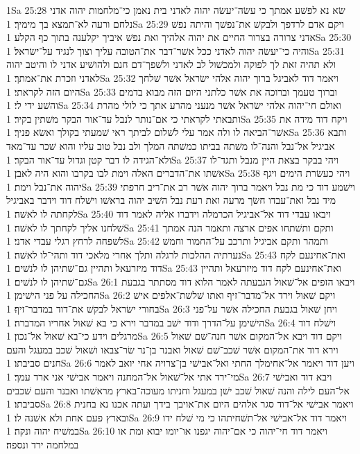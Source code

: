 1Sa 25:28  שׂא נא לפשׁע אמתך כי עשׂה־יעשׂה יהוה לאדני בית נאמן כי־מלחמות יהוה אדני נלחם ורעה לא־תמצא בך מימיך׃
1Sa 25:29  ויקם אדם לרדפך ולבקשׁ את־נפשׁך והיתה נפשׁ אדני צרורה בצרור החיים את יהוה אלהיך ואת נפשׁ איביך יקלענה בתוך כף הקלע׃
1Sa 25:30  והיה כי־יעשׂה יהוה לאדני ככל אשׁר־דבר את־הטובה עליך וצוך לנגיד על־ישׂראל׃
1Sa 25:31  ולא תהיה זאת לך לפוקה ולמכשׁול לב לאדני ולשׁפך־דם חנם ולהושׁיע אדני לו והיטב יהוה לאדני וזכרת את־אמתך׃
1Sa 25:32  ויאמר דוד לאביגל ברוך יהוה אלהי ישׂראל אשׁר שׁלחך היום הזה לקראתי׃
1Sa 25:33  וברוך טעמך וברוכה את אשׁר כלתני היום הזה מבוא בדמים והשׁע ידי לי׃
1Sa 25:34  ואולם חי־יהוה אלהי ישׂראל אשׁר מנעני מהרע אתך כי לולי מהרת ותבאתי לקראתי כי אם־נותר לנבל עד־אור הבקר משׁתין בקיר׃
1Sa 25:35  ויקח דוד מידה את אשׁר־הביאה לו ולה אמר עלי לשׁלום לביתך ראי שׁמעתי בקולך ואשׂא פניך׃
1Sa 25:36  ותבא אביגיל אל־נבל והנה־לו משׁתה בביתו כמשׁתה המלך ולב נבל טוב עליו והוא שׁכר עד־מאד ולא־הגידה לו דבר קטן וגדול עד־אור הבקר׃
1Sa 25:37  ויהי בבקר בצאת היין מנבל ותגד־לו אשׁתו את־הדברים האלה וימת לבו בקרבו והוא היה לאבן׃
1Sa 25:38  ויהי כעשׂרת הימים ויגף יהוה את־נבל וימת׃
1Sa 25:39  וישׁמע דוד כי מת נבל ויאמר ברוך יהוה אשׁר רב את־ריב חרפתי מיד נבל ואת־עבדו חשׂך מרעה ואת רעת נבל השׁיב יהוה בראשׁו וישׁלח דוד וידבר באביגיל לקחתה לו לאשׁה׃
1Sa 25:40  ויבאו עבדי דוד אל־אביגיל הכרמלה וידברו אליה לאמר דוד שׁלחנו אליך לקחתך לו לאשׁה׃
1Sa 25:41  ותקם ותשׁתחו אפים ארצה ותאמר הנה אמתך לשׁפחה לרחץ רגלי עבדי אדני׃
1Sa 25:42  ותמהר ותקם אביגיל ותרכב על־החמור וחמשׁ נערתיה ההלכות לרגלה ותלך אחרי מלאכי דוד ותהי־לו לאשׁה׃
1Sa 25:43  ואת־אחינעם לקח דוד מיזרעאל ותהיין גם־שׁתיהן לו לנשׁים׃
1Sa 25:43  ואת־אחינעם לקח דוד מיזרעאל ותהיין גם־שׁתיהן לו לנשׁים׃
1Sa 26:1  ויבאו הזפים אל־שׁאול הגבעתה לאמר הלוא דוד מסתתר בגבעת החכילה על פני הישׁימן׃
1Sa 26:2  ויקם שׁאול וירד אל־מדבר־זיף ואתו שׁלשׁת־אלפים אישׁ בחורי ישׂראל לבקשׁ את־דוד במדבר־זיף׃
1Sa 26:3  ויחן שׁאול בגבעת החכילה אשׁר על־פני הישׁימן על־הדרך ודוד ישׁב במדבר וירא כי בא שׁאול אחריו המדברה׃
1Sa 26:4  וישׁלח דוד מרגלים וידע כי־בא שׁאול אל־נכון׃
1Sa 26:5  ויקם דוד ויבא אל־המקום אשׁר חנה־שׁם שׁאול וירא דוד את־המקום אשׁר שׁכב־שׁם שׁאול ואבנר בן־נר שׂר־צבאו ושׁאול שׁכב במעגל והעם חנים סביבתו׃
1Sa 26:6  ויען דוד ויאמר אל־אחימלך החתי ואל־אבישׁי בן־צרויה אחי יואב לאמר מי־ירד אתי אל־שׁאול אל־המחנה ויאמר אבישׁי אני ארד עמך׃
1Sa 26:7  ויבא דוד ואבישׁי אל־העם לילה והנה שׁאול שׁכב ישׁן במעגל וחניתו מעוכה־בארץ מראשׁתו ואבנר והעם שׁכבים סביבתו׃
1Sa 26:8  ויאמר אבישׁי אל־דוד סגר אלהים היום את־אויבך בידך ועתה אכנו נא בחנית ובארץ פעם אחת ולא אשׁנה לו׃
1Sa 26:9  ויאמר דוד אל־אבישׁי אל־תשׁחיתהו כי מי שׁלח ידו במשׁיח יהוה ונקה׃
1Sa 26:10  ויאמר דוד חי־יהוה כי אם־יהוה יגפנו או־יומו יבוא ומת או במלחמה ירד ונספה׃

